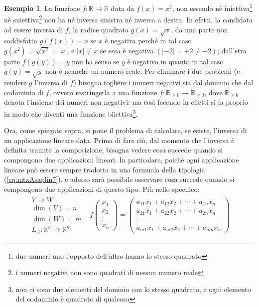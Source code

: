 \documentclass{book}
\newcommand{\abs}[1]{\lvert#1\rvert}
\theoremstyle{definition}
\newtheorem{es}{Esempio}[section]
\theoremstyle{plain}
\begin{document}
\begin{es}
  \label{es:Compinveeproddimatrici1}
  La funzione $f:\mathds{R}\to \mathds{R}$ data da $f(x)=x^2$, non essendo nè iniettiva\footnote{due numeri uno
    l'opposto dell'altro hanno lo stesso quadrato} nè suiettiva\footnote{i numeri negativi non sono quadrati di nessun
    numero reale} non ha né inversa sinistra né inversa a destra. In efetti, la candidata ad essere inversa di $f$,
  la radice quadrata $g(x)=\sqrt{x}$, da una parte non soddisfatta $g(f(x))=x$ se $x$ è negativa perché in tal caso
  $g(x^2)=\sqrt{x^2}=\abs{x}$, e $\abs{x}\neq x$ se essa è negativa $(\abs{-2}=+2\neq -2)$; dall'stra parte $f(g(y))=y$
  non ha senso se $y$ è negativo in quanto in tal caso $g(y)=\sqrt{y}$ non è neanche un numero reale. Per eliminare i
  due problemi (e rendere $g$ l'inversa di $f$) bisogna togliere i numeri negativi sia dal dominio che dal codominio di
  $f$, ovvero restringerla a una funzione $f:\mathds{R}_{\geq 0}\to \mathds{R}_{\geq0}$, dove $\mathds{R}_{\geq 0}$ denota
  l'insieme dei numeri non negativi: ma così facendo in effetti si fa proprio in modo che diventi una funzione
  biiettiva\footnote{non ci sono due elementi del dominio con lo stesso quadrato, e ogni elemento del codominio è
    quadrato di qualcosa}.
\end{es}
Ora, come spiegato sopra, si pone il problema di calcolare, se esiste, l'inversa di un applicazione lineare data. Prima
di fare ciò, dal momento che l'inversa è definita tramite la composizione, bisogna vedere cosa succede quando si compongono
due applicazioni lineari. In particolare, poiché ogni applicazione lineare può essere sempre tradotta in una formuala della
tipologia (\ref{eq:mtxAsaplin7}), e adesso sarà possibile osservare cosa succede quando si compongono due applicazioni di
questo tipo. Più nello specifico:
\begin{eqnarray}
  \label{eq:Compinveeproddimatrici1}
  \begin{matrix}
    V\to W\\
    \dim(V)=n\\
    \dim(W)=m\\
    L_A:\mathds{K}^n\to\mathds{K}^m
  \end{matrix} & f
                 \begin{pmatrix}
                   x_1\\
                   x_2\\
                   \vdots\\
                   x_n
                 \end{pmatrix}=
                 \begin{pmatrix}
                   a_{11}x_1+a_{12}x_2+\cdots+a_{1n}x_n\\
                   a_{21}x_1+a_{22}x_2+\cdots+a_{2n}x_n\\
                   \vdots\\
                   a_{m1}x_1+a_{m2}x_2+\cdots+a_{mn}x_n
                 \end{pmatrix}
\end{eqnarray}
\end{document}
